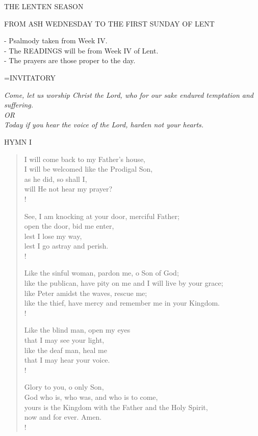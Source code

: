 \begin{center}\normalsize THE LENTEN SEASON\\
\begin{center}
\normalsize \footnotesize FROM ASH WEDNESDAY TO THE FIRST SUNDAY OF LENT\\
\end{center}
\footnotesize - Psalmody taken from Week IV.\\
\footnotesize - The READINGS will be from Week IV of Lent.\\
\footnotesize - The prayers are those proper to the day.\\
\end{center}

\hangindent=\parindent \small{INVITATORY}
\begin{center}
\textit{Come, let us worship Christ the Lord, who for our sake endured temptation and suffering.\\}
\textit{OR\\}
\textit{Today if you hear the voice of the Lord, harden not your hearts.\\}
\end{center}

\noindent\small{\uppercase{Hymn I }}\normalsize\label{lent:firstHymn}
\begin{verse}
I will come back to my Father's house,\\
I will be welcomed like the Prodigal Son,\\
as he did, so shall I,\\
will He not hear my prayer?\\!

See, I am knocking at your door, merciful Father;\\
open the door, bid me enter,\\
lest I lose my way,\\
lest I go astray and perish.\\!

Like the sinful woman, pardon me, o Son of God;\\
like the publican, have pity on me and I will live by your grace;\\
like Peter amidst the waves, rescue me;\\
like the thief, have mercy and remember me in your Kingdom.\\!

Like the blind man, open my eyes\\
that I may see your light,\\
like the deaf man,  heal me\\
that I may hear your voice.\\!

Glory to you, o only Son,\\
God who is, who was, and who is to come,\\
yours is the Kingdom with the Father and the Holy Spirit,\\
now and for ever. Amen.\\!
\end{verse}

